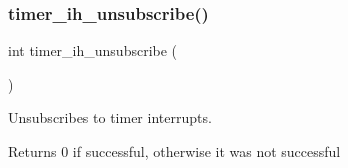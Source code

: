 \subsubsection{\texorpdfstring{timer\+\_\+ih\+\_\+unsubscribe()}{timer\_ih\_unsubscribe()}}
{\footnotesize\ttfamily int timer\+\_\+ih\+\_\+unsubscribe (\begin{DoxyParamCaption}{ }\end{DoxyParamCaption})}



Unsubscribes to timer interrupts. 

\begin{DoxyReturn}{Returns}
0 if successful, otherwise it was not successful 
\end{DoxyReturn}
